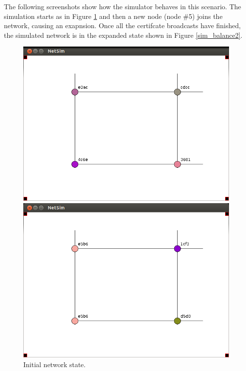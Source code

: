 \documentclass[ %
                    author={Luke Murray},
                supervisor={Dr. Simon Hollis},
                     title={Shadow Peer-to-Peer Networks},
                  subtitle={},
                    degree={MEng},
                      year={2013} ]{thesis}
\begin{document}
The following screenshots show how the simulator behaves in this scenario. The simulation starts as in Figure \ref{sim_balance1} and then a new node (node \#5) joins the network, causing an exapnsion. Once all the certifcate broadcasts have finished, the simulated network is in the expanded state shown in Figure \ref{sim_balance2}.

\begin{figure}[h]
    \centering
    \begin{minipage}[b]{0.45\linewidth}
        \centering
        \includegraphics[width=\linewidth]{sim_pics/balance_1.png}
        \caption{Initial network state.}
        \label{sim_balance1}
    \end{minipage}
    \hspace{0.5cm}
    \begin{minipage}[b]{0.45\linewidth}
        \centering
        \includegraphics[width=\linewidth]{sim_pics/expand_4.png}

\end{minipage}
\end{figure}
\end{document}
